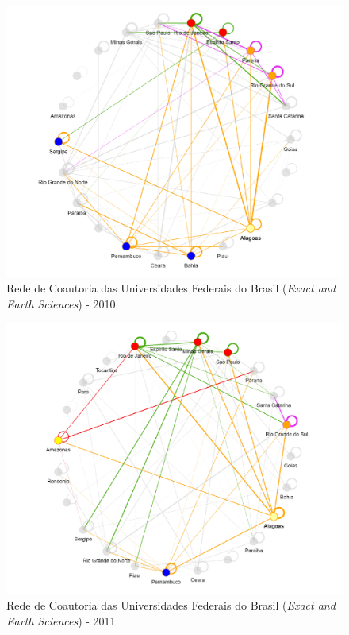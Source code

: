 \begin{figure}[H]
	\centering
	\includegraphics[width=\linewidth]{Imagens/rede-exact-AL-2010.pdf}
	\caption{Rede de Coautoria das Universidades Federais do Brasil (\textit{Exact and Earth Sciences}) - 2010}
	\label{Rede de Coautoria - UF EXACT AL 2010}
\end{figure}

\begin{figure}[H]
	\centering
	\includegraphics[width=\linewidth]{Imagens/rede-exact-AL-2011.pdf}
	\caption{Rede de Coautoria das Universidades Federais do Brasil (\textit{Exact and Earth Sciences}) - 2011}
	\label{Rede de Coautoria - UF EXACT AL 2012}
\end{figure}


